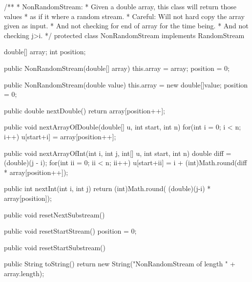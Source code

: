 \begin{code}
\begin{hide}

/**
 *   NonRandomStream:     
 * Given a double array, this class will return those values
 * as if it where a random stream.
 * Careful: Will not hard copy the array given as input.
 * And not checking for end of array for the time being.
 * And not checking j>i.
 */
    protected class NonRandomStream implements RandomStream
    {
       double[] array;
       int position;

       public NonRandomStream(double[] array)
       {
	  this.array = array;
	  position = 0;
       }

       public NonRandomStream(double value)
       {
	  this.array = new double[]{value};
	  position = 0;
       }

       public double nextDouble()
       {
          return array[position++];
       }
    
       public void nextArrayOfDouble(double[] u, int start, int n)
       {
	  for(int i = 0; i < n; i++)
	     u[start+i] = array[position++];
       }

       public void nextArrayOfInt(int i, int j, int[] u, 
			         int start, int n)
       {
	  double diff = (double)(j - i);
	  for(int ii = 0; ii < n; ii++)
	      u[start+ii] = i + 
		(int)Math.round(diff * array[position++]);
       }
    
       public int nextInt(int i, int j)
       {
	  return (int)Math.round( (double)(j-i) * array[position]);
       }

    
       public void resetNextSubstream()
       {
       }

       public void resetStartStream()
       {
	  position = 0;
       }

       public void resetStartSubstream()
       {
       }

       public String toString()
       {
	 return new String("NonRandomStream of length " +
		      array.length);
       }
    }


\end{hide}
\end{code}

\begin{code}
\begin{hide}
}
\end{hide}
\end{code}
